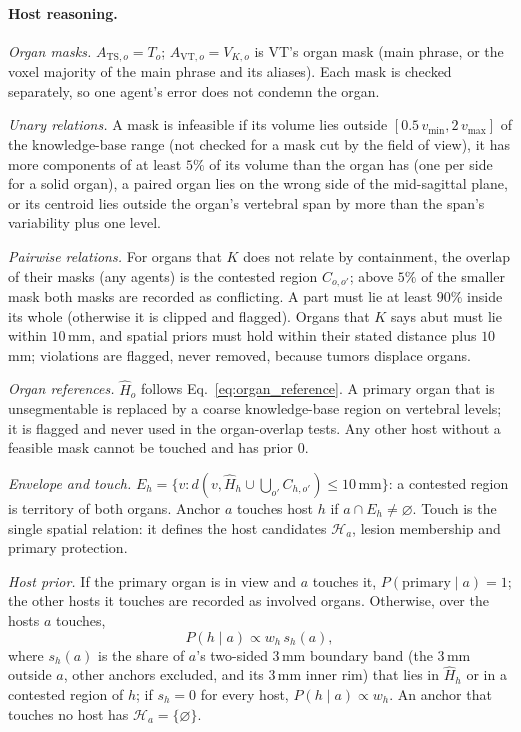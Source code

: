 \documentclass[fleqn,10pt]{olplainarticle}
\begin{document}
\paragraph{Host reasoning.}
\label{sec:host_details}
\emph{Organ masks.} $A_{\mathrm{TS},o}=T_o$; $A_{\mathrm{VT},o}=V_{K,o}$ is VT's organ mask (main phrase, or the voxel
majority of the main phrase and its aliases). Each mask is checked separately, so one agent's error does not condemn the organ.

\emph{Unary relations.} A mask is infeasible if its volume lies outside $[0.5\,v_{\min},2\,v_{\max}]$ of the knowledge-base
range (not checked for a mask cut by the field of view), it has more components of at least $5\%$ of its volume than the
organ has (one per side for a solid organ), a paired organ lies on the wrong side of the mid-sagittal plane, or its centroid
lies outside the organ's vertebral span by more than the span's variability plus one level.

\emph{Pairwise relations.} For organs that $K$ does not relate by containment, the overlap of their masks (any agents) is the
contested region $C_{o,o'}$; above $5\%$ of the smaller mask both masks are recorded as conflicting. A part must lie at least
$90\%$ inside its whole (otherwise it is clipped and flagged). Organs that $K$ says abut must lie within $10$\,mm, and spatial
priors must hold within their stated distance plus $10$\,mm; violations are flagged, never removed, because tumors displace
organs.

\emph{Organ references.} $\hat H_o$ follows Eq.~\eqref{eq:organ_reference}. A primary organ that is unsegmentable is replaced
by a coarse knowledge-base region on vertebral levels; it is flagged and never used in the organ-overlap tests. Any other
host without a feasible mask cannot be touched and has prior $0$.

\emph{Envelope and touch.} $E_h=\{v:d(v,\hat H_h\cup\textstyle\bigcup_{o'}C_{h,o'})\le10\,\mathrm{mm}\}$: a contested region is
territory of both organs. Anchor $a$ touches host $h$ if $a\cap E_h\neq\varnothing$.
Touch is the single spatial relation: it defines the host candidates $\mathcal{H}_a$, lesion membership and primary protection.

\emph{Host prior.} If the primary organ is in view and $a$ touches it, $P(\text{primary}\mid a)=1$; the other hosts it
touches are recorded as involved organs. Otherwise, over the hosts $a$ touches,
\begin{equation}
\label{eq:host_prior}
P(h\mid a)\propto w_h\,s_h(a),
\end{equation}
where $s_h(a)$ is the share of $a$'s two-sided $3$\,mm boundary band (the $3$\,mm outside $a$, other anchors excluded, and its
$3$\,mm inner rim) that lies in $\hat H_h$ or in a contested region of $h$; if $s_h=0$ for every host, $P(h\mid a)\propto w_h$. An anchor that touches no host
has $\mathcal{H}_a=\{\varnothing\}$.
\end{document}
